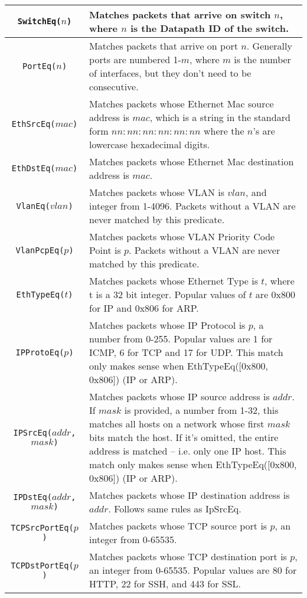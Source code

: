 \bigskip
\begin{tabularx}{6in}{|c|X|}
\hline\hline
\texttt{SwitchEq($n$)} & Matches packets that arrive on switch $n$, where $n$ is the Datapath ID of the switch.  
\\ \hline
\texttt{PortEq($n$)} & Matches packets that arrive on port $n$.  Generally ports are numbered 1-$m$, where $m$ is the
number of interfaces, but they don't need to be consecutive.  
\\ \hline
\texttt{EthSrcEq($mac$)} & Matches packets whose Ethernet Mac source address is $mac$, which is a string in the standard form $nn:nn:nn:nn:nn:nn$ where the $n$'s are lowercase hexadecimal digits.
\\ \hline
\texttt{EthDstEq($mac$)} & Matches packets whose Ethernet Mac destination address is $mac$.
\\ \hline
\texttt{VlanEq($vlan$)} & Matches packets whose VLAN is $vlan$, and integer from 1-4096.  Packets without a VLAN are never matched by this predicate.
\\ \hline
\texttt{VlanPcpEq($p$)} & Matches packets whose VLAN Priority Code Point is $p$.  Packets without a VLAN are never matched by this predicate.
\\ \hline
\texttt{EthTypeEq($t$)} & Matches packets whose Ethernet Type is $t$, where t is a 32 bit integer.  Popular values of $t$ are 0x800 for IP and 0x806 for ARP.  
\\ \hline
\texttt{IPProtoEq($p$)} & Matches packets whose IP Protocol is $p$, a number from 0-255.  
Popular values are 1 for ICMP, 6 for TCP and 17 for UDP.  
This match only makes sense when EthTypeEq([0x800, 0x806]) (IP or ARP). 
\\ \hline
\texttt{IPSrcEq($addr$, $mask$)} & Matches packets whose IP source address is $addr$.  
If $mask$ is provided, a number from 1-32, this matches all hosts on a network whose first $mask$ bits match the host.
If it's omitted, the entire address is matched -- i.e. only one IP host.  
This match only makes sense when EthTypeEq([0x800, 0x806]) (IP or ARP). 
\\ \hline
\texttt{IPDstEq($addr$, $mask$)} & Matches packets whose IP destination address is $addr$.  
Follows same rules as IpSrcEq.
\\ \hline
\texttt{TCPSrcPortEq($p$)} & Matches packets whose TCP source port is $p$, an integer from 0-65535.
\\ \hline
\texttt{TCPDstPortEq($p$)} & Matches packets whose TCP destination port is $p$, an integer from 0-65535.
Popular values are 80 for HTTP, 22 for SSH, and 443 for SSL.  
\\ \hline\hline
\end{tabularx}

